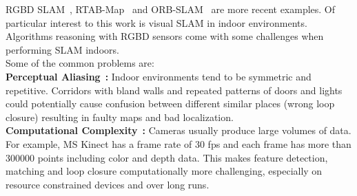 RGBD SLAM~\cite{burgard:rgbd-slam}, RTAB-Map~\cite{rtabmap} and ORB-SLAM~\cite{orbslam} are more recent examples. 
Of particular interest to this work is visual SLAM in indoor environments.
Algorithms reasoning with RGBD sensors come with some challenges when performing SLAM indoors. \\
Some of the common problems are:\\
\textbf{Perceptual Aliasing}~\cite{perceptual_aliasing1,visual_wifi_2}\textbf{:} Indoor environments tend to be symmetric and repetitive. Corridors with bland walls and repeated patterns of doors and lights could potentially cause confusion between different similar places (wrong loop closure) resulting in faulty maps and bad localization. \\
\textbf{Computational Complexity}~\cite{computational_complexity1,memory_management2}\textbf{:} Cameras usually produce large volumes of data. 
For example, MS Kinect has a frame rate of 30 fps and each frame has more than 300000 points including color and depth data. 
This makes feature detection, matching and loop closure computationally more challenging, especially on resource constrained devices and over long runs.


